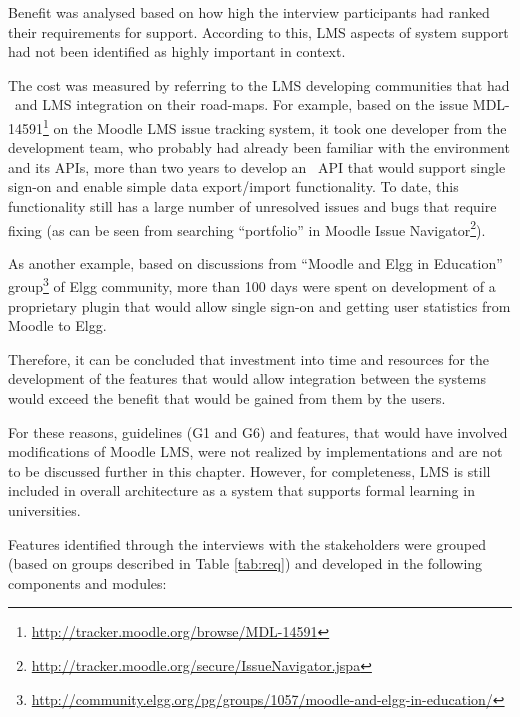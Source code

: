 Benefit was analysed based on how high the interview participants had ranked
their requirements for \LLLs support. According to this, LMS aspects of system
support had not been identified as highly important in \LLLs context. 

The cost was measured by referring to the LMS developing communities that had
\ep~and LMS integration on their road-maps. For example, based on the issue
MDL-14591\footnote{\url{http://tracker.moodle.org/browse/MDL-14591}} on the
Moodle LMS issue tracking system, it took one developer from the development
team, who probably had already been familiar with the environment and its
APIs, more than two years to develop an \ep~API that would support single
sign-on and enable simple data export/import functionality. To date, this
functionality still has a large number of unresolved issues and bugs that
require fixing (as can be seen from searching ``portfolio'' in Moodle Issue
Navigator\footnote{\url{http://tracker.moodle.org/secure/IssueNavigator.jspa}}).

As another example, based on discussions from ``Moodle and Elgg in Education''
group\footnote{\url{http://community.elgg.org/pg/groups/1057/moodle-and-elgg-in-education/}}
of Elgg community, more than 100 days were spent on development of a proprietary
plugin that would allow single sign-on and getting user statistics from Moodle
to Elgg.

Therefore, it can be concluded that investment into time and resources for the
development of the features that would allow integration between the systems
would exceed the benefit that would be gained from them by the users.

For these reasons, guidelines (G1 and G6) and features, that would have involved
modifications of Moodle LMS, were not realized by implementations and are not to
be discussed further in this chapter. However, for completeness, LMS is still
included in overall architecture as a system that supports formal learning in
universities.
 
Features identified through the interviews with the stakeholders were grouped
(based on groups described in Table \ref{tab:req}) and developed in the
following components and modules:

